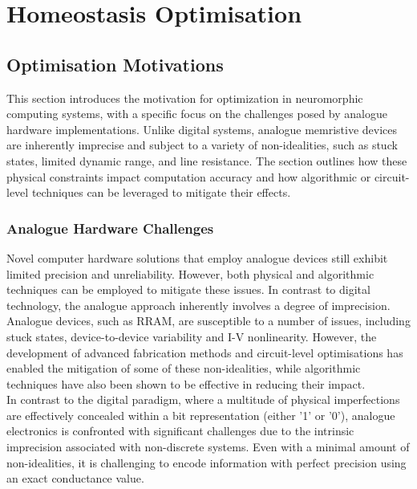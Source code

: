 
\chapter{Homeostasis Optimisation}

\section[Optimisation Motivations]{Optimisation Motivations}

This section introduces the motivation for optimization in neuromorphic computing systems, with a specific focus on the challenges posed by analogue hardware implementations. Unlike digital systems, analogue memristive devices are inherently imprecise and subject to a variety of non-idealities, such as stuck states, limited dynamic range, and line resistance. The section outlines how these physical constraints impact computation accuracy and how algorithmic or circuit-level techniques can be leveraged to mitigate their effects.

\subsection[Analogue Hardware Challenges]{Analogue Hardware Challenges}

\noindent Novel computer hardware solutions that employ analogue devices still exhibit limited precision and unreliability. However, both physical and algorithmic techniques can be employed to mitigate these issues. In contrast to digital technology, the analogue approach inherently involves a degree of imprecision. \\

\noindent Analogue devices, such as RRAM, are susceptible to a number of issues, including stuck states, device-to-device variability and I-V nonlinearity. However, the development of advanced fabrication methods and circuit-level optimisations has enabled the mitigation of some of these non-idealities, while algorithmic techniques have also been shown to be effective in reducing their impact.\\

\noindent In contrast to the digital paradigm, where a multitude of physical imperfections are effectively concealed within a bit representation (either '1' or '0'), analogue electronics is confronted with significant challenges due to the intrinsic imprecision associated with non-discrete systems. Even with a minimal amount of non-idealities, it is challenging to encode information with perfect precision using an exact conductance value.\\

